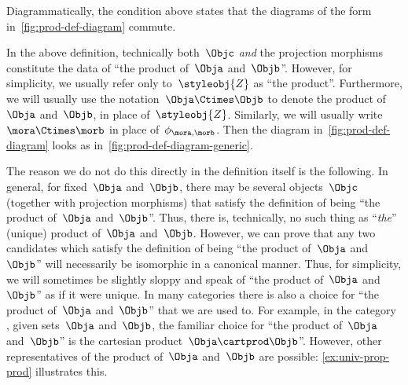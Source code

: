 \begin{marginfigure}
    \centering
    \caption{}
    \label{fig:prod-def-diagram}
\end{marginfigure}

\begin{remark}
    \label{re:prod-comm-diag}
    Diagrammatically, the condition above states that the diagrams of the form in~\cref{fig:prod-def-diagram} commute.
\end{remark}

\begin{marginfigure}
    \centering
    \caption{}
    \label{fig:prod-def-diagram-generic}
\end{marginfigure}

\begin{remark}
    \label{prod unique up to iso}
    In the above definition, technically both~$\Objc$ \emph{and} the projection morphisms constitute the data of ``the product of~$\Obja$ and~$\Objb$''.
    However, for simplicity, we usually refer only to~$\styleobj{Z}$ as ``the product''.
    Furthermore, we will usually use the notation~$\Obja \Ctimes \Objb$ to denote the product of~$\Obja$ and~$\Objb$, in place of~$\styleobj{Z}$.
    Similarly, we will usually write~$\mora \Ctimes \morb$ in place of~$\phi_{\mora, \morb}$.
    Then the diagram in~\cref{fig:prod-def-diagram} looks as in~\cref{fig:prod-def-diagram-generic}.

    The reason we do not do this directly in the definition itself is the following.
    In general, for fixed~$\Obja$ and~$\Objb$, there may be several objects~$\Objc$ (together with projection morphisms) that satisfy the definition of being ``the product of~$\Obja$ and~$\Objb$''.
    Thus, there is, technically, no such thing as ``\emph{the}'' (unique) product of~$\Obja$ and~$\Objb$.
    However, we can prove that any two candidates which satisfy the definition of being ``the product of~$\Obja$ and~$\Objb$'' will necessarily be isomorphic in a canonical manner.
    Thus, for simplicity, we will sometimes be slightly sloppy and speak of ``the product of~$\Obja$ and~$\Objb$'' as if it were unique.
    In many categories there is also a choice for ``the product of~$\Obja$ and~$\Objb$'' that we are used to.
    For example, in the category \Set, given sets~$\Obja$ and~$\Objb$, the familiar choice for ``the product of~$\Obja$ and~$\Objb$'' is the cartesian product~$\Obja \cartprod \Objb$''.
    However, other representatives of the product of~$\Obja$ and~$\Objb$ are possible: \cref{ex:univ-prop-prod} illustrates this.
\end{remark}

